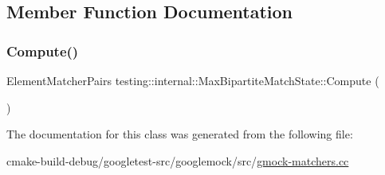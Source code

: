 \subsection{Member Function Documentation}
\mbox{\label{classtesting_1_1internal_1_1MaxBipartiteMatchState_af6efab664ee390925b24d023f1368192}} 
\subsubsection{\texorpdfstring{Compute()}{Compute()}}
{\footnotesize\ttfamily Element\+Matcher\+Pairs testing\+::internal\+::\+Max\+Bipartite\+Match\+State\+::\+Compute (\begin{DoxyParamCaption}{ }\end{DoxyParamCaption})\hspace{0.3cm}{\ttfamily [inline]}}



The documentation for this class was generated from the following file\+:\begin{DoxyCompactItemize}
\item 
cmake-\/build-\/debug/googletest-\/src/googlemock/src/\mbox{\hyperlink{gmock-matchers_8cc}{gmock-\/matchers.\+cc}}\end{DoxyCompactItemize}
